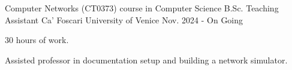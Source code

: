 
\begin{cventries}

    \cventry
        {Computer Networks (CT0373) course in Computer Science B.Sc.} %
        {Teaching Assistant} %
        {Ca' Foscari University of Venice} %
        {Nov. 2024 - On Going} %
        {
                \begin{cvitems} %
                        \item {30 hours of work.}
                        \item {Assisted professor in documentation setup and building a network simulator.}
                \end{cvitems}
        }
\end{cventries}